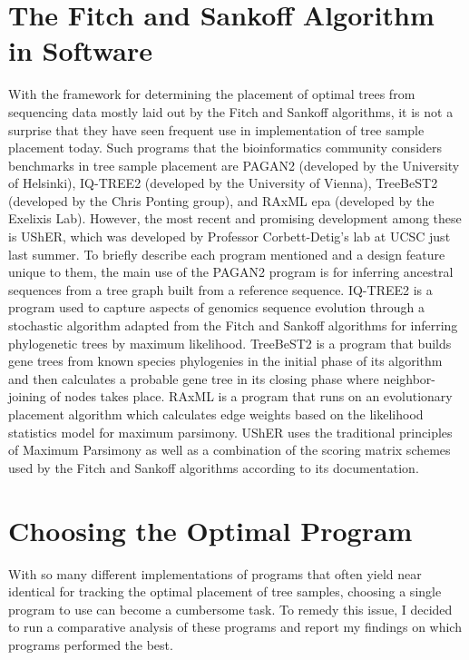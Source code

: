 \documentclass[12pt,journal,compsoc]{IEEEtran}
\begin{document}
\section{The Fitch and Sankoff Algorithm in Software}
With the framework for determining the placement of optimal trees from sequencing data mostly laid out by the Fitch and Sankoff algorithms, it is not a surprise that they have seen frequent  use in implementation of tree sample placement today. Such programs that the bioinformatics community considers benchmarks in tree sample placement are PAGAN2 (developed by the University of Helsinki)\cite{prog:pagan2}, IQ-TREE2 (developed by the University of Vienna)\cite{prog:iqtree2}, TreeBeST2 (developed by the Chris Ponting group)\cite{prog:treebest2}, and RAxML epa (developed by the Exelixis Lab)\cite{prog:raxml}. However, the most recent and promising development among these is UShER, which was developed by Professor Corbett-Detig’s lab at UCSC just last summer\cite{usher:PLOS}. To briefly describe each program mentioned and a design feature unique to them, the main use of the PAGAN2 program is for inferring ancestral sequences from a tree graph built from a reference sequence. IQ-TREE2 is a program used to capture aspects of genomics sequence evolution through a stochastic algorithm adapted from the Fitch and Sankoff algorithms for inferring phylogenetic trees by maximum likelihood. TreeBeST2 is a program that builds gene trees from known species phylogenies in the initial phase of its algorithm and then calculates a probable gene tree in its closing phase where neighbor-joining of nodes takes place. RAxML is a program that runs on an evolutionary placement algorithm which calculates edge weights based on the  likelihood statistics model for maximum parsimony. UShER uses the traditional principles of Maximum Parsimony as well as a combination of the scoring matrix schemes used by the Fitch and Sankoff algorithms according to its documentation. 

\section{Choosing the Optimal Program}
With so many different implementations of programs that often yield near identical for tracking the optimal placement of tree samples, choosing a single program to use can become a cumbersome task. To remedy this issue, I decided to run a comparative analysis of these programs and report my findings on which programs performed the best.
\end{document}

